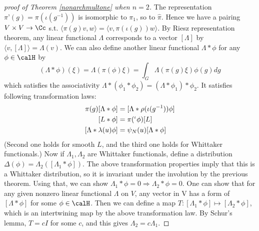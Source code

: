 \documentclass{article}
\newcommand{\pre}[1]{\prescript{#1}{}}
\begin{document}
\begin{proof}[proof of Theorem \ref{nonarchmultone} when $n = 2$]
The representation $\pi’(g) = \pi(\iota(g^{-1}))$ is isomorphic to $\pi_1$, so to $\hat{\pi}$. Hence we have a pairing $V \times V \to \Cc$ s.t. $\langle \pi(g)v,w \rangle = \langle v,\pi(\iota(g))w\rangle$. By Riesz representation theorem, any linear functional $\Lambda$ corresponds to a vector $[\Lambda]$ by $\langle v, [\Lambda]\rangle = \Lambda(v)$. 
We can also define another linear functional $\Lambda * \phi$ for any $\phi \in \calH$ by
$$
(\Lambda * \phi)(\xi) = \Lambda(\pi(\phi)\xi) = \int_{G} \Lambda(\pi(g)\xi)\phi(g)dg
$$ 
which satisfies the associativity $\Lambda * (\phi_1 * \phi_2) = (\Lambda * \phi_1) * \phi_2$. 
It satisfies following transformation laws:
\begin{align*}
\pi(g) [\Lambda*\phi] &= [\Lambda * \rho(\iota(g^{-1}))\phi] \\
[L* \phi] &= \pi(\pre{\iota}{}\phi)[L]\\
[\Lambda * \lambda(u)\phi] &= \psi_N(u)[\Lambda * \phi]
\end{align*}
(Second one holds for smooth $L$, and the third one holds for Whittaker functionals.) 
 Now if $\Lambda_1,\Lambda_2$ are Whittaker functionals, define a distribution $\Delta(\phi) = \Lambda_2([\Lambda_1 * \phi])$. 
 The above transformation properties imply that this is a Whittaker distribution, so it is invariant under the involution by the previous theorem. Using that, we can show $\Lambda_1 * \phi = 0 \Rightarrow \Lambda_2 * \phi = 0$. One can show that for any given nonzero linear functional $\Lambda$ on $V$, any vector in V has a form of $[\Lambda * \phi]$ for some $\phi\in \calH$. 
Then  we can define a map $T:[\Lambda_1 * \phi] \mapsto  [\Lambda_2 * \phi]$, which is an intertwining map by the above transformation law. By Schur’s lemma, $T = cI$ for some $c$, and this gives $\Lambda_2 = c\Lambda_1$. 
\end{proof}
\end{document}
